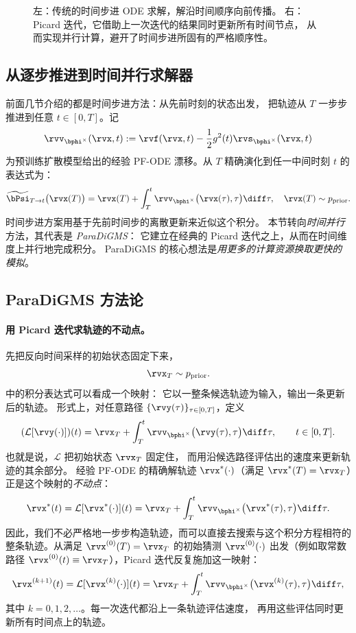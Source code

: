 \begin{figure}[th!]
  \vspace{-0.4em}
  \caption{
左：传统的时间步进 ODE 求解，解沿时间顺序向前传播。
右：Picard 迭代，它借助上一次迭代的结果同时更新所有时间节点，
从而实现并行计算，避开了时间步进所固有的严格顺序性。
}
\end{figure}


\subsection{从逐步推进到时间并行求解器}

前面几节介绍的都是时间步进方法：从先前时刻的状态出发，
把轨迹从 $T$ 一步步推进到任意 $t\in[0,T]$。记
\[
\rvv_{\bphi^\times}(\rvx,t):=\rvf(\rvx, t) - \frac{1}{2}g^2(t) \rvs_{\bphi^\times}(\rvx,t)
\]
为预训练扩散模型给出的经验 PF-ODE 漂移。从 $T$ 精确演化到任一中间时刻 $t$ 的表达式为：
\begin{equation}\label{eq:picard_T_to_t}
    \widetilde\bPsi_{T\to t}\big(\rvx(T)\big)
    =
    \rvx(T)
    + \int_{T}^{t}\rvv_{\bphi^\times}\big(\rvx(\tau),\tau\big)\diff\tau,
    \quad \rvx(T)\sim p_{\mathrm{prior}}.
\end{equation}
时间步进方案用基于先前时间步的离散更新来近似这个积分。
本节转向\emph{时间并行}方法，其代表是 \emph{ParaDiGMS}：
它建立在经典的 Picard 迭代之上，从而在时间维度上并行地完成积分。
ParaDiGMS 的核心想法是\emph{用更多的计算资源换取更快的模拟}。


\subsection{ParaDiGMS 方法论}


\paragraph{用 Picard 迭代求轨迹的不动点。}
先把反向时间采样的初始状态固定下来，
\[
\rvx_T\sim p_{\mathrm{prior}}.
\]
 中的积分表达式可以看成一个映射：
它以一整条候选轨迹为输入，输出一条更新后的轨迹。
形式上，对任意路径 $\{\rvy(\tau)\}_{\tau\in[0,T]}$，定义
\[
(\mathcal{L}[\rvy(\cdot)])(t)
=
\rvx_T
+
\int_T^t
\rvv_{\bphi^\times}\big(\rvy(\tau),\tau\big)\diff\tau,
\qquad
t\in[0,T].
\]
也就是说，$\mathcal{L}$ 把初始状态 $\rvx_T$ 固定住，
而用沿候选路径评估出的速度来更新轨迹的其余部分。
经验 PF-ODE 的精确解轨迹 $\rvx^*(\cdot)$（满足
$\rvx^*(T)=\rvx_T$）正是这个映射的\emph{不动点}：
\[
\rvx^*(t)
=
\mathcal{L}[\rvx^*(\cdot)](t)
=
\rvx_T
+
\int_T^t
\rvv_{\bphi^\times}\big(\rvx^*(\tau),\tau\big)\diff\tau.
\]
因此，我们不必严格地一步步构造轨迹，而可以直接去搜索与这个积分方程相符的整条轨迹。从满足 $\rvx^{(0)}(T)=\rvx_T$ 的初始猜测 $\rvx^{(0)}(\cdot)$ 出发（例如取常数路径
$\rvx^{(0)}(t)\equiv\rvx_T$），Picard 迭代反复施加这一映射：
\begin{align}\label{eq:picard_iter_T_to_t}
\rvx^{(k+1)}(t)
=
\mathcal{L}[\rvx^{(k)}(\cdot)](t)
=
\rvx_T
+
\int_T^t
\rvv_{\bphi^\times}
\big(\rvx^{(k)}(\tau),\tau\big)\diff\tau,
\end{align}
其中 $k=0,1,2,\ldots$。每一次迭代都沿上一条轨迹评估速度，
再用这些评估同时更新所有时间点上的轨迹。

